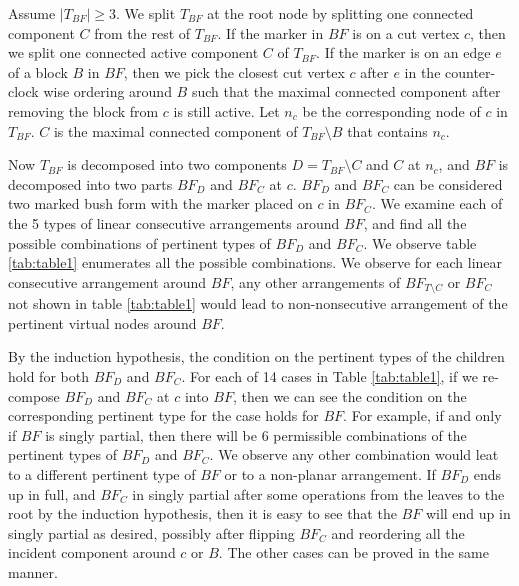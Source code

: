 \documentclass[a4]{jgaa-art}
\begin{document}
\begin{appendices}
Assume $|T_{BF}| \ge 3$.
We split $T_{BF}$ at the root node by splitting one connected component $C$ from the rest of $T_{BF}$.
If the marker in $BF$ is on a cut vertex $c$, then we split one connected active component $C$ of $T_{BF}$.
If the marker is on an edge $e$ of a block $B$ in $BF$, then we pick the closest cut vertex $c$ 
after $e$ in the counter-clock wise ordering around $B$ 
such that the maximal connected component after
removing the block from $c$ is still active.
Let $n_c$ be the corresponding node of $c$ in $T_{BF}$.
$C$ is the maximal connected component of $T_{BF} \setminus B$ that contains $n_c$.

Now $T_{BF}$ is decomposed into two components $D=T_{BF} \setminus C$ and $C$ at $n_c$, and
 $BF$ is decomposed into two parts $BF_{D}$ and $BF_{C}$ at $c$. 
$BF_{D}$ and $BF_{C}$ can be considered two marked bush form with the marker placed on $c$ in $BF_{C}$.
We examine each of the 5 types of linear consecutive arrangements around $BF$, 
and find all the possible combinations of pertinent types of $BF_{D}$ and $BF_{C}$.
We observe table \ref{tab:table1} enumerates all the possible combinations.
We observe for each linear consecutive arrangement around $BF$, any other
arrangements of $BF_{T\setminus C}$ or $BF_{C}$ not shown in table \ref{tab:table1} 
would lead to non-nonsecutive arrangement of the pertinent virtual nodes around $BF$.

By the induction hypothesis, the condition on the pertinent types of the children hold 
for both $BF_{D}$ and $BF_{C}$.
For each of 14 cases in Table \ref{tab:table1}, if we re-compose $BF_{D}$ and $BF_{C}$ at $c$ into $BF$, 
then we can see the condition on the corresponding pertinent type for the case holds for $BF$.
For example, if and only if $BF$ is singly partial, then there will be 6 permissible combinations of the
pertinent types of $BF_{D}$ and $BF_{C}$. We observe any other combination would leat to a different
pertinent type of $BF$ or to a non-planar arrangement.
If $BF_{D}$ ends up in full, and $BF_{C}$ in singly partial after some operations from the leaves to the root
by the induction hypothesis,
then it is easy to see that the $BF$ will end up in singly partial as desired, possibly after flipping
$BF_{C}$ and reordering all the incident component around $c$ or $B$.
The other cases can be proved in the same manner.



\end{appendices}
\end{document}

